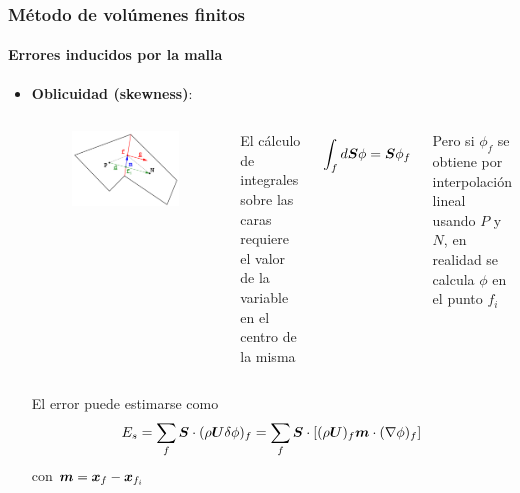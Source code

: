 \begin{frame}
    \frametitle{M\'etodo de vol\'umenes finitos}
    \framesubtitle{Errores inducidos por la malla}

    \begin{itemize}

    \item \textbf{Oblicuidad (skewness)}:

      \begin{columns}
      
      \begin{figure}[h]
        \begin{center}
          \includegraphics[width = \textwidth]{Imagenes/Skew}
        \end{center}
      \end{figure}

      
      \small
      El c\'alculo de integrales sobre las caras requiere el valor de la variable en el centro de la misma

      $$ \int_f d\boldsymbol{S} \phi = \boldsymbol{S} \phi_f $$

      Pero si $\phi_f$ se obtiene por interpolaci\'on lineal usando $P$ y $N$, en realidad se calcula $\phi$ en el punto $f_i$

      \end{columns}

      \vspace{0.5cm}
      \small
      El error puede estimarse como
      $$ E_s = \sum_f \boldsymbol{S} \cdot (\rho \boldsymbol{U} \delta \phi)_f = \sum_f \boldsymbol{S} \cdot \left [ (\rho \boldsymbol{U} )_f \boldsymbol{m} \cdot (\nabla \phi)_f \right ]$$
      con $\boldsymbol{m} = \boldsymbol{x}_f - \boldsymbol{x}_{f_i} $
      
      
      
    \end{itemize}

\end{frame}
